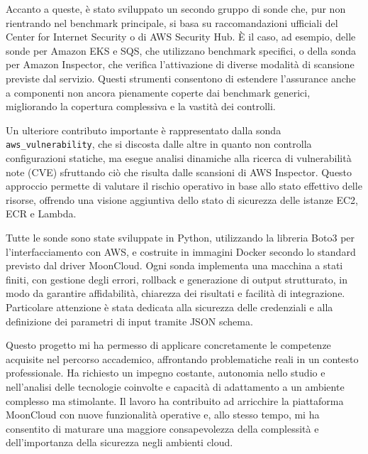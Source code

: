 \documentclass[11pt,a4paper]{article}
\begin{document}
Accanto a queste, è stato sviluppato un secondo gruppo di sonde che, pur non rientrando nel benchmark principale, si basa su raccomandazioni ufficiali del Center for Internet Security o di AWS Security Hub. È il caso, ad esempio, delle sonde per Amazon EKS e SQS, che utilizzano benchmark specifici, o della sonda per Amazon Inspector, che verifica l'attivazione di diverse modalità di scansione previste dal servizio. Questi strumenti consentono di estendere l'assurance anche a componenti non ancora pienamente coperte dai benchmark generici, migliorando la copertura complessiva e la vastità dei controlli.

Un ulteriore contributo importante è rappresentato dalla sonda \texttt{aws\_vulnerability}, che si discosta dalle altre in quanto non controlla configurazioni statiche, ma esegue analisi dinamiche alla ricerca di vulnerabilità note (CVE) sfruttando ciò che risulta dalle scansioni di AWS Inspector. Questo approccio permette di valutare il rischio operativo in base allo stato effettivo delle risorse, offrendo una visione aggiuntiva dello stato di sicurezza delle istanze EC2, ECR e Lambda.

Tutte le sonde sono state sviluppate in Python, utilizzando la libreria Boto3 per l'interfacciamento con AWS, e costruite in immagini Docker secondo lo standard previsto dal driver MoonCloud. Ogni sonda implementa una macchina a stati finiti, con gestione degli errori, rollback e generazione di output strutturato, in modo da garantire affidabilità, chiarezza dei risultati e facilità di integrazione. Particolare attenzione è stata dedicata alla sicurezza delle credenziali e alla definizione dei parametri di input tramite JSON schema.

Questo progetto mi ha permesso di applicare concretamente le competenze acquisite nel percorso accademico, affrontando problematiche reali in un contesto professionale. Ha richiesto un impegno costante, autonomia nello studio e nell'analisi delle tecnologie coinvolte e capacità di adattamento a un ambiente complesso ma stimolante. Il lavoro ha contribuito ad arricchire la piattaforma MoonCloud con nuove funzionalità operative e, allo stesso tempo, mi ha consentito di maturare una maggiore consapevolezza della complessità e dell'importanza della sicurezza negli ambienti cloud.
\end{document}
